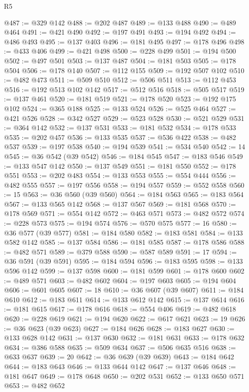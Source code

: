 \begin{lexlean}{R5}
\begin{coremodule}
@487 := @329 @142
@488 := @202 @487
@489 := @133 @488
@490 := @489 @464
@491 := @421 @490
@492 := @197 @491
@493 := @194 @492
@494 := @486 @493
@495 := @137 @403
@496 := @181 @495
@497 := @178 @496
@498 := @433 @406
@499 := @421 @498
@500 := @228 @499
@501 := @194 @500
@502 := @497 @501
@503 := @137 @487
@504 := @181 @503
@505 := @178 @504
@506 := @178 @140
@507 := @112 @155
@509 := @192 @507 @102
@510 := @482 @473
@511 := @509 @510
@512 := @506 @511
@513 := @112 @453
@516 := @192 @513 @102 @142
@517 := @512 @516
@518 := @505 @517
@519 := @137 @461
@520 := @181 @519
@521 := @178 @520
@523 := @192 @175 @102
@524 := @365 @188
@525 := @133 @524
@526 := @525 @464
@527 := @421 @526
@528 := @342 @527
@529 := @523 @528
@530 := @521 @529
@531 := @364 @142
@532 := @137 @531
@533 := @181 @532
@534 := @178 @533
@535 := @202 @457
@536 := @133 @535
@537 := @536 @422
@538 := @482 @537
@539 := @197 @538
@540 := @194 @539
@541 := @534 @540
@542 := 14
@545 := @36 @542 (@39 @542)
@546 := @184 @545
@547 := @183 @546
@549 := @133 @547 @142
@550 := @137 @549
@551 := @181 @550
@552 := @178 @551
@553 := @202 @483
@554 := @133 @553
@555 := @554 @444
@556 := @482 @555
@557 := @197 @556
@558 := @194 @557
@559 := @552 @558
@560 := 15
@563 := @36 @560 (@39 @560)
@564 := @184 @563
@565 := @183 @564
@567 := @133 @565 @142
@568 := @137 @567
@569 := @181 @568
@570 := @178 @569
@571 := @554 @142
@572 := @463 @571
@573 := @482 @572
@574 := @228 @573
@575 := @194 @574
@576 := @570 @575
@577 := 16
@580 := @36 @577 (@39 @577)
@581 := @184 @580
@582 := @183 @581
@584 := @133 @582 @142
@585 := @137 @584
@586 := @181 @585
@587 := @178 @586
@588 := @482 @571
@589 := @379 @588
@590 := @587 @589
@591 := 17
@594 := @36 @591 (@39 @591)
@595 := @184 @594
@596 := @183 @595
@598 := @133 @596 @142
@599 := @137 @598
@600 := @181 @599
@601 := @178 @600
@602 := @489 @571
@603 := @482 @602
@604 := @197 @603
@605 := @194 @604
@606 := @601 @605
@607 := 18
@610 := @36 @607 (@39 @607)
@611 := @184 @610
@612 := @183 @611
@614 := @133 @612 @142
@615 := @137 @614
@616 := @181 @615
@617 := @178 @616
@618 := @554 @406
@619 := @482 @618
@620 := @228 @619
@621 := @194 @620
@622 := @617 @621
@623 := 19
@626 := @36 @623 (@39 @623)
@627 := @184 @626
@628 := @183 @627
@630 := @133 @628 @142
@631 := @137 @630
@632 := @181 @631
@633 := @178 @632
@634 := @386 @588
@635 := @509 @634
@637 := @506 @635 @516
@638 := @633 @637
@639 := 20
@642 := @36 @639 (@39 @639)
@643 := @184 @642
@644 := @183 @643
@646 := @133 @644 @142
@647 := @137 @646
@648 := @181 @647
@649 := @178 @648
@650 := @202 @531
@652 := @133 @650 @571
@653 := @482 @652

\end{coremodule}
\end{lexlean}
